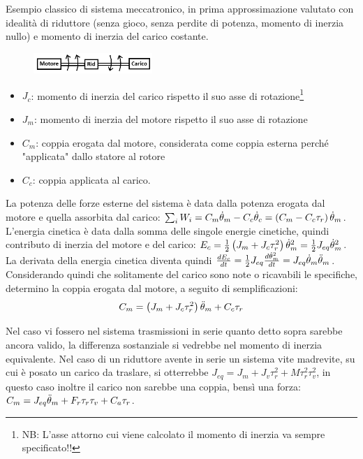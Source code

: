 Esempio classico di sistema meccatronico, in prima approssimazione valutato con idealità di riduttore (senza gioco, senza perdite di potenza, momento di inerzia nullo) e momento di inerzia del carico costante.

\begin{figure}[h]
    \centering
    \includegraphics[width=0.4\textwidth]{Immagini/motoreriduttorecarico_id.png}
\end{figure}


\begin{itemize}
    \item $J_c$: momento di inerzia del carico rispetto il suo asse di rotazione\footnote{NB: L'asse attorno cui viene calcolato il momento di inerzia va sempre specificato!!}
    \item $J_m$: momento di inerzia del motore rispetto il suo asse di rotazione
    \item $C_m$: coppia erogata dal motore, considerata come coppia esterna perché "applicata" dallo statore al rotore
    \item $C_c$: coppia applicata al carico.
\end{itemize}

La potenza delle forze esterne del sistema è data dalla potenza erogata dal motore e quella assorbita dal carico: $\sum_i W_i=C_m \dot{\theta}_m -C_c \dot{\theta}_c=\left(C_m -C_c \tau_r\right)\dot{\theta}_m$. L'energia cinetica è data dalla somma delle singole energie cinetiche, quindi contributo di inerzia del motore e del carico: $E_c=\frac{1}{2} \left(J_m + J_c\tau_r^2 \right)\dot{\theta}_m^2=\frac{1}{2} J_{eq} \dot{\theta}_m^2$.
La derivata della energia cinetica diventa quindi $\frac{dE_c}{dt}=\frac{1}{2} J_{eq}\frac{d\dot{\theta}_m^2}{dt}=J_{eq}\dot{\theta}_m \Ddot{\theta}_m$.
Considerando quindi che solitamente del carico sono note o ricavabili le specifiche, determino la coppia erogata dal motore, a seguito di semplificazioni: \[C_m=\left(J_m+J_c\tau_r^2\right)\Ddot{\theta}_m+C_c\tau_r\]

Nel caso vi fossero nel sistema trasmissioni in serie quanto detto sopra sarebbe ancora valido, la differenza sostanziale si vedrebbe nel momento di inerzia equivalente.
Nel caso di un riduttore avente in serie un sistema vite madrevite, su cui è posato un carico da traslare, si otterrebbe $J_{eq}=J_m+J_v \tau^2_r + M \tau_r^2 \tau_v^2$, in questo caso inoltre il carico non sarebbe una coppia, bensì una forza: $C_m=J_{eq}\Ddot{\theta}_m + F_r \tau_r \tau_v + C_a \tau_r$. \label{TrasmissioneSerie}

